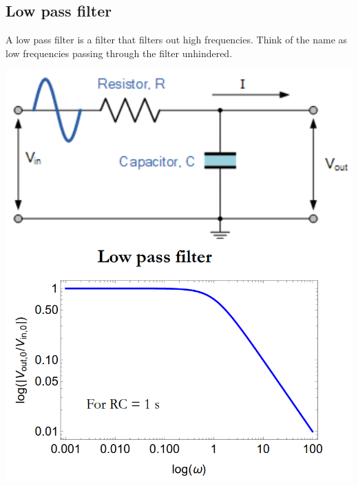 \documentclass[11pt]{article}
\begin{document}
\subsection{Low pass filter}
\label{sec:orgb264992}
A low pass filter is a filter that filters out high frequencies. Think of the name as low frequencies passing through the filter unhindered.

\begin{center}
\includegraphics[width=.9\linewidth]{./images/low-pass-filter.png}
\end{center}
\end{document}
